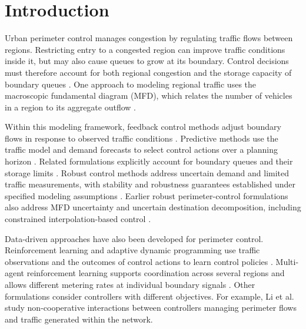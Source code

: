 \documentclass[preprint,12pt]{elsarticle}
\theoremstyle{definition}
\theoremstyle{plain}
\theoremstyle{definition}
\theoremstyle{plain}
\begin{document}
\section{Introduction}
\label{sec:new-introduction}

Urban perimeter control manages congestion by regulating traffic flows
between regions. Restricting entry to a congested region can
improve traffic conditions inside it, but may also cause queues to grow at
its boundary. Control decisions must therefore account for both regional
congestion and the storage capacity of boundary queues
\cite{haddad2017queues}. One approach to modeling regional traffic uses
the macroscopic fundamental diagram (MFD), which relates the number of
vehicles in a region to its aggregate outflow
\cite{geroliminis2008existence,daganzo2008analytical,geroliminis2011properties}.

Within this modeling framework, feedback control methods adjust boundary
flows in response to observed traffic conditions
\cite{keyvan2012gating,aboudolas2013perimeter}. Predictive methods use the
traffic model and demand forecasts to select control actions over a
planning horizon \cite{geroliminis2013mpc,sirmatel2018economic}. Related
formulations explicitly account for boundary queues and their storage
limits \cite{haddad2017queues}. Robust control methods address uncertain
demand and limited traffic measurements, with stability and robustness
guarantees established under specified modeling assumptions
\cite{zhong2018robust,mohajerpoor2020hinf}. Earlier robust perimeter-control
formulations also address MFD uncertainty and uncertain destination
decomposition, including constrained interpolation-based control
\cite{haddad2014robust,haddad2015robust}.

Data-driven approaches have also been developed for perimeter control.
Reinforcement learning and adaptive dynamic programming use traffic
observations and the outcomes of control actions to learn control policies
\cite{chen2022dataefficient,chen2024iadp}. Multi-agent reinforcement
learning supports coordination across several regions and allows
different metering rates at individual boundary signals
\cite{zhou2023scalable,yu2025physicsperimeter}. Other formulations consider
controllers with different objectives. For example, Li et al.\ \cite{li2024beyond}
study non-cooperative interactions between controllers managing perimeter
flows and traffic generated within the network.
\end{document}
